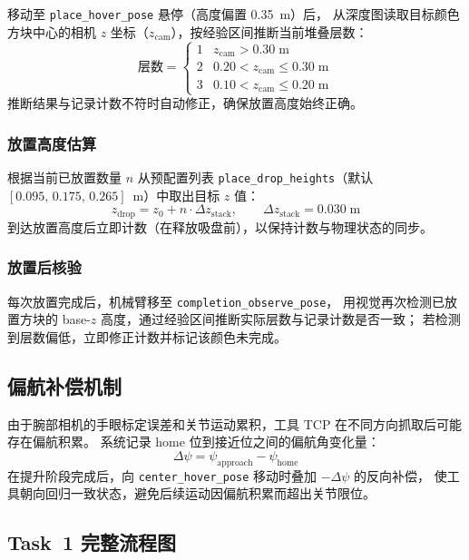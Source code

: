 \documentclass[12pt,a4paper]{article}
\begin{document}
移动至 \texttt{place\_hover\_pose} 悬停（高度偏置 0.35~m）后，
从深度图读取目标颜色方块中心的相机 $z$ 坐标（$z_\mathrm{cam}$），按经验区间推断当前堆叠层数：
\begin{equation}
  \text{层数} =
  \begin{cases}
    1 & z_\mathrm{cam} > 0.30\;\mathrm{m} \\
    2 & 0.20 < z_\mathrm{cam} \leq 0.30\;\mathrm{m} \\
    3 & 0.10 < z_\mathrm{cam} \leq 0.20\;\mathrm{m}
  \end{cases}
  \label{eq:layer_inference}
\end{equation}
推断结果与记录计数不符时自动修正，确保放置高度始终正确。

\subsubsection{放置高度估算}

根据当前已放置数量 $n$ 从预配置列表 \texttt{place\_drop\_heights}（默认 $[0.095,\,0.175,\,0.265]$~m）中取出目标 $z$ 值：
\[
  z_\mathrm{drop} = z_0 + n \cdot \Delta z_\mathrm{stack}, \qquad \Delta z_\mathrm{stack} = 0.030\;\mathrm{m}
\]
到达放置高度后立即计数（在释放吸盘前），以保持计数与物理状态的同步。

\subsubsection{放置后核验}

每次放置完成后，机械臂移至 \texttt{completion\_observe\_pose}，
用视觉再次检测已放置方块的 base-$z$ 高度，通过经验区间推断实际层数与记录计数是否一致；
若检测到层数偏低，立即修正计数并标记该颜色未完成。

\subsection{偏航补偿机制}

由于腕部相机的手眼标定误差和关节运动累积，工具 TCP 在不同方向抓取后可能存在偏航积累。
系统记录 home 位到接近位之间的偏航角变化量：
\[
  \Delta\psi = \psi_\mathrm{approach} - \psi_\mathrm{home}
\]
在提升阶段完成后，向 \texttt{center\_hover\_pose} 移动时叠加 $-\Delta\psi$ 的反向补偿，
使工具朝向回归一致状态，避免后续运动因偏航积累而超出关节限位。

\subsection{Task~1 完整流程图}
\end{document}
